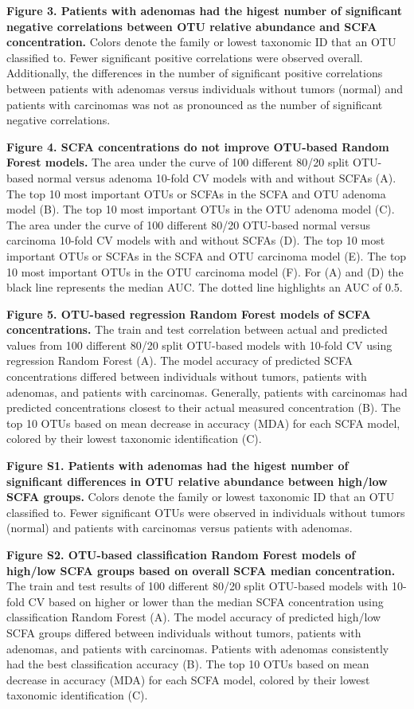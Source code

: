 \documentclass[11pt,]{article}
\begin{document}
\textbf{Figure 3. Patients with adenomas had the higest number of
significant negative correlations between OTU relative abundance and
SCFA concentration.} Colors denote the family or lowest taxonomic ID
that an OTU classified to. Fewer significant positive correlations were
observed overall. Additionally, the differences in the number of
significant positive correlations between patients with adenomas versus
individuals without tumors (normal) and patients with carcinomas was not
as pronounced as the number of significant negative correlations.

\textbf{Figure 4. SCFA concentrations do not improve OTU-based Random
Forest models.} The area under the curve of 100 different 80/20 split
OTU-based normal versus adenoma 10-fold CV models with and without SCFAs
(A). The top 10 most important OTUs or SCFAs in the SCFA and OTU adenoma
model (B). The top 10 most important OTUs in the OTU adenoma model (C).
The area under the curve of 100 different 80/20 OTU-based normal versus
carcinoma 10-fold CV models with and without SCFAs (D). The top 10 most
important OTUs or SCFAs in the SCFA and OTU carcinoma model (E). The top
10 most important OTUs in the OTU carcinoma model (F). For (A) and (D)
the black line represents the median AUC. The dotted line highlights an
AUC of 0.5.

\textbf{Figure 5. OTU-based regression Random Forest models of SCFA
concentrations.} The train and test correlation between actual and
predicted values from 100 different 80/20 split OTU-based models with
10-fold CV using regression Random Forest (A). The model accuracy of
predicted SCFA concentrations differed between individuals without
tumors, patients with adenomas, and patients with carcinomas. Generally,
patients with carcinomas had predicted concentrations closest to their
actual measured concentration (B). The top 10 OTUs based on mean
decrease in accuracy (MDA) for each SCFA model, colored by their lowest
taxonomic identification (C).

\newpage

\textbf{Figure S1. Patients with adenomas had the higest number of
significant differences in OTU relative abundance between high/low SCFA
groups.} Colors denote the family or lowest taxonomic ID that an OTU
classified to. Fewer significant OTUs were observed in individuals
without tumors (normal) and patients with carcinomas versus patients
with adenomas.

\textbf{Figure S2. OTU-based classification Random Forest models of
high/low SCFA groups based on overall SCFA median concentration.} The
train and test results of 100 different 80/20 split OTU-based models
with 10-fold CV based on higher or lower than the median SCFA
concentration using classification Random Forest (A). The model accuracy
of predicted high/low SCFA groups differed between individuals without
tumors, patients with adenomas, and patients with carcinomas. Patients
with adenomas consistently had the best classification accuracy (B). The
top 10 OTUs based on mean decrease in accuracy (MDA) for each SCFA
model, colored by their lowest taxonomic identification (C).
\end{document}
